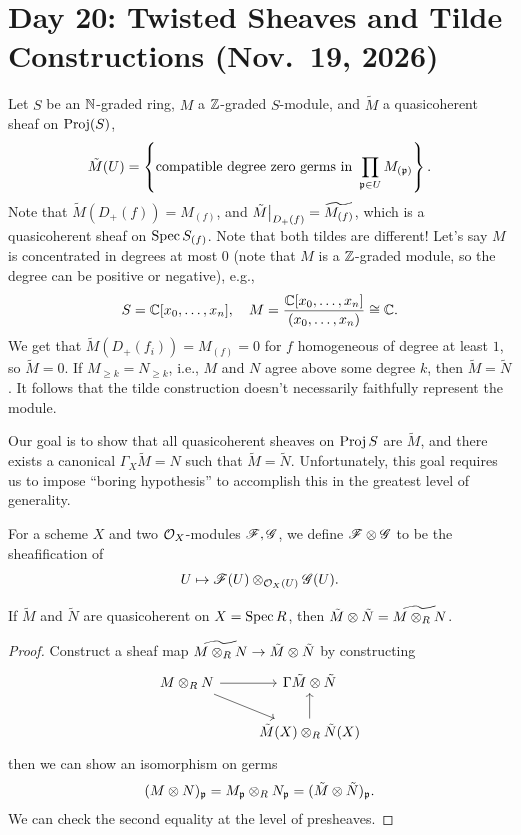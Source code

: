 \section{Day 20: Twisted Sheaves and Tilde Constructions (Nov.\ 19, 2026)}
Let $S$ be an $\mathbb N$-graded ring, $M$ a $\mathbb Z$-graded $S$-module, and $\tilde M$ a quasicoherent sheaf on $\operatorname{Proj}(S)$,
\[ \tilde M(U) = \left\{\text{compatible degree zero germs in } \prod_{\mathfrak p \in U} M_{(\mathfrak p)}\right\}. \]
Note that $\tilde M(D_+(f)) = M_{(f)}$, and $\restr{\tilde M}{D_+(f)} = \wt{M_{(f)}}$, which is a quasicoherent sheaf on $\operatorname{Spec} S_{(f)}$. Note that both tildes are different! Let's say $M$ is concentrated in degrees at most $0$ (note that $M$ is a $\mathbb Z$-graded module, so the degree can be positive or negative), e.g.,
\[ S = \mathbb C[x_0, \dots, x_n], \quad M = \frac{\mathbb C[x_0, \dots, x_n]}{(x_0, \dots, x_n)} \cong \mathbb C. \]
We get that $\tilde M(D_+(f_i)) = M_{(f)} = 0$ for $f$ homogeneous of degree at least $1$, so $\tilde M = 0$. If $M_{\geq k} = N_{\geq k}$, i.e., $M$ and $N$ agree above some degree $k$, then $\tilde M = \tilde N$. It follows that the tilde construction doesn't necessarily faithfully represent the module.

Our goal is to show that all quasicoherent sheaves on $\operatorname{Proj} S$ are $\tilde M$, and there exists a canonical $\Gamma_X \tilde M = N$ such that $\tilde M = \tilde N$. Unfortunately, this goal requires us to impose ``boring hypothesis'' to accomplish this in the greatest level of generality.

For a scheme $X$ and two $\mathcal O_X$-modules $\mathscr F, \mathscr G$, we define $\mathscr F \otimes \mathscr G$ to be the sheafification of
\[ U \mapsto \mathscr F(U) \otimes_{\mathcal O_X(U)} \mathscr G(U). \] \vspace{-24pt}
\begin{fact}
    If $\tilde M$ and $\tilde N$ are quasicoherent on $X = \operatorname{Spec} R$, then $\tilde M \otimes \tilde N = \widetilde{M \otimes_R N}$.
\end{fact}
\begin{proof}
    Construct a sheaf map $\widetilde{M \otimes_R N} \to \tilde M \otimes \tilde N$ by constructing
    \[ \begin{tikzcd}
        M \otimes_R N \arrow[r] \arrow[dr] & \Gamma \tilde M \otimes \tilde N \\
        & \tilde M(X) \otimes_R \tilde N(X) \arrow[u]
    \end{tikzcd}
    \]
    then we can show an isomorphism on germs
    \[ (M \otimes N)_\mathfrak p = M_\mathfrak p \otimes_R N_\mathfrak p = (\tilde M \otimes \tilde N)_\mathfrak p. \]
    We can check the second equality at the level of presheaves.
\end{proof}

